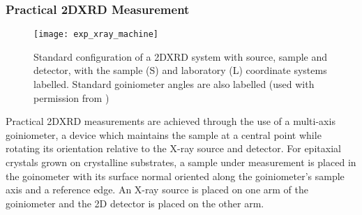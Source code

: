 \subsubsection{Practical 2DXRD Measurement}
\begin{figure}
 \centering \texttt{[image: exp\_xray\_machine]}
 \caption[Typical 2DXRD experimental implementation]{\label{fig:exp_xray_machine}Standard configuration of a 2DXRD system with source, sample and detector, with the sample (S) and laboratory (L) coordinate systems labelled. Standard goiniometer angles are also labelled (used with permission from \cite{He2009})}
\end{figure}
Practical 2DXRD measurements are achieved through the use of a multi-axis goiniometer, a device which maintains the sample at a central point while rotating its orientation relative to the X-ray source and detector.
For epitaxial crystals grown on crystalline substrates, a sample under measurement is placed in the goinometer with its surface normal oriented along the goiniometer's sample axis and a reference edge.
An X-ray source is placed on one arm of the goiniometer and the 2D detector is placed on the other arm.

